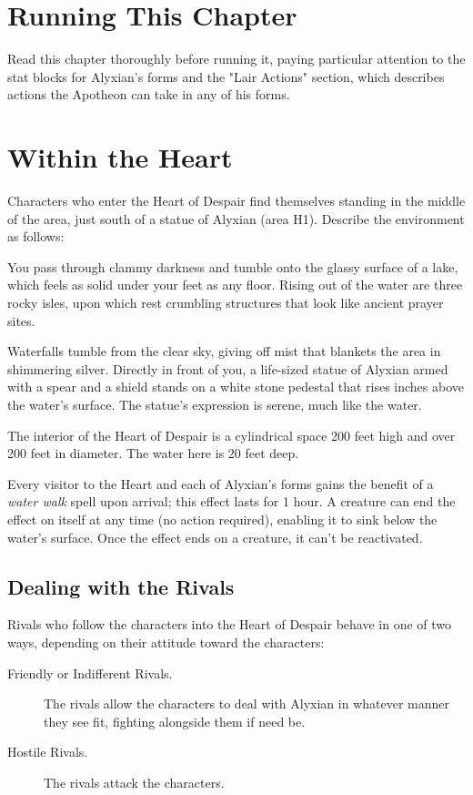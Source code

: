 \documentclass[10pt,a4paper,twoside,fancy,bg=print,twocolumn,openany,nodeprecatedcode]{dndbook}
\begin{document}
\section{Running This Chapter}
Read this chapter thoroughly before running it, paying particular attention to the stat blocks for Alyxian's forms and the "Lair Actions" section, which describes actions the Apotheon can take in any of his forms.

\section{Within the Heart}
Characters who enter the Heart of Despair find themselves standing in the middle of the area, just south of a statue of Alyxian (area H1). Describe the environment as follows:

\begin{DndReadAloud}{}
You pass through clammy darkness and tumble onto the glassy surface of a lake, which feels as solid under your feet as any floor. Rising out of the water are three rocky isles, upon which rest crumbling structures that look like ancient prayer sites.

Waterfalls tumble from the clear sky, giving off mist that blankets the area in shimmering silver. Directly in front of you, a life-sized statue of Alyxian armed with a spear and a shield stands on a white stone pedestal that rises inches above the water's surface. The statue's expression is serene, much like the water.

\end{DndReadAloud}

The interior of the Heart of Despair is a cylindrical space 200 feet high and over 200 feet in diameter. The water here is 20 feet deep.

Every visitor to the Heart and each of Alyxian's forms gains the benefit of a \textit{water walk} spell upon arrival; this effect lasts for 1 hour. A creature can end the effect on itself at any time (no action required), enabling it to sink below the water's surface. Once the effect ends on a creature, it can't be reactivated.

\subsection{Dealing with the Rivals}
Rivals who follow the characters into the Heart of Despair behave in one of two ways, depending on their attitude toward the characters:


\begin{description}
\item[Friendly or Indifferent Rivals.]
The rivals allow the characters to deal with Alyxian in whatever manner they see fit, fighting alongside them if need be.
\item[Hostile Rivals.]
The rivals attack the characters.
\end{description}
\end{document}

